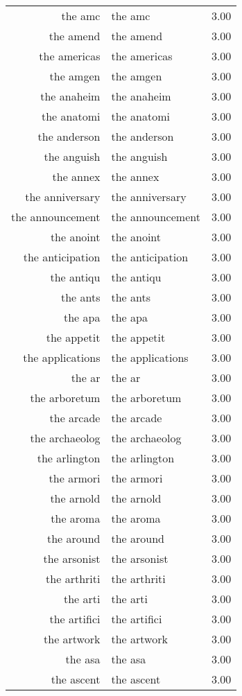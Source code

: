\begin{table}[ht]
\begin{tabular}{rlr}
  the amc & the amc & 3.00 \\ 
  the amend & the amend & 3.00 \\ 
  the americas & the americas & 3.00 \\ 
  the amgen & the amgen & 3.00 \\ 
  the anaheim & the anaheim & 3.00 \\ 
  the anatomi & the anatomi & 3.00 \\ 
  the anderson & the anderson & 3.00 \\ 
  the anguish & the anguish & 3.00 \\ 
  the annex & the annex & 3.00 \\ 
  the anniversary & the anniversary & 3.00 \\ 
  the announcement & the announcement & 3.00 \\ 
  the anoint & the anoint & 3.00 \\ 
  the anticipation & the anticipation & 3.00 \\ 
  the antiqu & the antiqu & 3.00 \\ 
  the ants & the ants & 3.00 \\ 
  the apa & the apa & 3.00 \\ 
  the appetit & the appetit & 3.00 \\ 
  the applications & the applications & 3.00 \\ 
  the ar & the ar & 3.00 \\ 
  the arboretum & the arboretum & 3.00 \\ 
  the arcade & the arcade & 3.00 \\ 
  the archaeolog & the archaeolog & 3.00 \\ 
  the arlington & the arlington & 3.00 \\ 
  the armori & the armori & 3.00 \\ 
  the arnold & the arnold & 3.00 \\ 
  the aroma & the aroma & 3.00 \\ 
  the around & the around & 3.00 \\ 
  the arsonist & the arsonist & 3.00 \\ 
  the arthriti & the arthriti & 3.00 \\ 
  the arti & the arti & 3.00 \\ 
  the artifici & the artifici & 3.00 \\ 
  the artwork & the artwork & 3.00 \\ 
  the asa & the asa & 3.00 \\ 
  the ascent & the ascent & 3.00 \\ 

\end{tabular}
\end{table}
